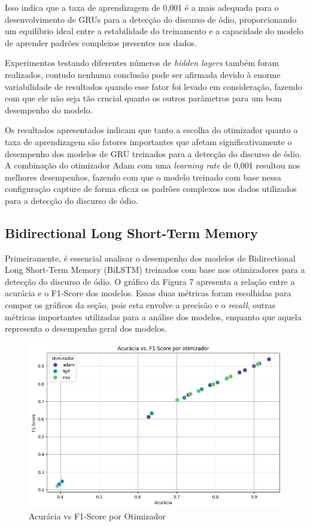 \documentclass[conference]{IEEEtran}
\begin{document}
Isso indica que a taxa de aprendizagem de 0,001 é a mais adequada para o desenvolvimento de GRUs para a detecção do discurso de ódio, proporcionando um equilíbrio ideal entre a estabilidade do treinamento e a capacidade do modelo de aprender padrões complexos presentes nos dados.

Experimentos testando diferentes números de \textit{hidden layers} também foram realizados, contudo nenhuma conclusão pode ser afirmada devido à enorme variabilidade de resultados quando esse fator foi levado em consideração, fazendo com que ele não seja tão crucial quanto os outros parâmetros para um bom desempenho do modelo.

Os resultados apresentados indicam que tanto a escolha do otimizador quanto a taxa de aprendizagem são fatores importantes que afetam significativamente o desempenho dos modelos de GRU treinados para a detecção do discurso de ódio. A combinação do otimizador Adam com uma \textit{learning rate} de 0,001 resultou nos melhores desempenhos, fazendo com que o modelo treinado com base nessa configuração capture de forma eficaz os padrões complexos nos dados utilizados para a detecção do discurso de ódio.

\subsection{Bidirectional Long Short-Term Memory}

Primeiramente, é essencial analisar o desempenho dos modelos de Bidirectional Long Short-Term Memory (BiLSTM) treinados com base nos otimizadores para a detecção do discurso de ódio. O gráfico da Figura 7 apresenta a relação entre a acurácia e o F1-Score dos modelos. Essas duas métricas foram escolhidas para compor os gráficos da seção, pois esta envolve a precisão e o \textit{recall}, outras métricas importantes utilizadas para a análise dos modelos, enquanto que aquela representa o desempenho geral dos modelos.

\begin{figure}[h!]
    \centering
    \includegraphics[width=\linewidth]{bilstm-otimizador.png}
    \caption{Acurácia vs F1-Score por Otimizador}
    \label{fig:exemplo4}
\end{figure}
\end{document}
